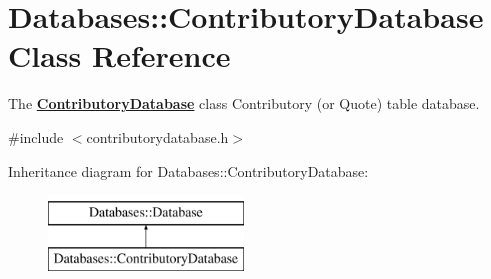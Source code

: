 \hypertarget{classDatabases_1_1ContributoryDatabase}{}\section{Databases\+:\+:Contributory\+Database Class Reference}
\label{classDatabases_1_1ContributoryDatabase}


The {\bfseries \hyperlink{classDatabases_1_1ContributoryDatabase}{Contributory\+Database}} class Contributory (or Quote) table database.  




{\ttfamily \#include $<$contributorydatabase.\+h$>$}

Inheritance diagram for Databases\+:\+:Contributory\+Database\+:\begin{figure}[H]
\begin{center}
\leavevmode
\includegraphics[height=2.000000cm]{dc/da5/classDatabases_1_1ContributoryDatabase}
\end{center}
\end{figure}
